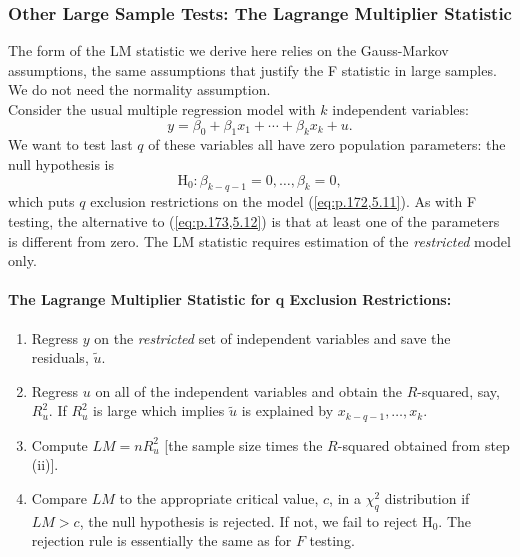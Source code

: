 \documentclass[a4paper, 10pt]{article}
\theoremstyle{definition}	%
\begin{document}
\subsubsection{Other Large Sample Tests: The Lagrange Multiplier Statistic}
The form of the LM statistic we derive here relies on the Gauss-Markov assumptions, the same
assumptions that justify the F statistic in large samples. We do not need the normality assumption.\\
Consider the usual multiple regression model with $k$ independent variables:
\begin{equation}
    y = \beta_0 + \beta_1x_1 + \cdots + \beta_kx_k + u. \label{eq:p.172,5.11}
\end{equation}
We want to test last $q$ of these variables all have zero population parameters:
the null hypothesis is
\begin{equation}
    \text{H}_0: \beta_{k-q-1} = 0, \ldots, \beta_k = 0, \label{eq:p.173,5.12} 
\end{equation}
which puts $q$ exclusion restrictions on the model (\ref{eq:p.172,5.11}). As with F testing, the alternative to (\ref{eq:p.173,5.12}) is that at least one of the parameters is different from zero. The LM statistic requires estimation of the \textit{restricted} model only. \\
\paragraph{The Lagrange Multiplier Statistic for q Exclusion
Restrictions:}
\begin{enumerate}
    \item [(i)] Regress $y$ on the \textit{restricted} set of independent variables and save the residuals, $\tilde{u}$.
    \item[(ii)] Regress $u$ on all of the independent variables and obtain the $R$-squared, say, $R_u^2$. If $R_u^2$ is large which implies $\tilde{u}$ is explained by $x_{k-q-1}, \ldots, x_k$.
    \item[(iii)] Compute $LM = nR_u^2$ [the sample size times the $R$-squared obtained from step (ii)].
    \item[(iv)]  Compare $LM$ to the appropriate critical value, $c$, in a $\chi_q^2$ distribution if $LM > c$, the null hypothesis is rejected.  If not, we fail to reject H$_0$. The rejection rule is essentially the same as for $F$ testing.
\end{enumerate}

\newpage
 
\end{document}
